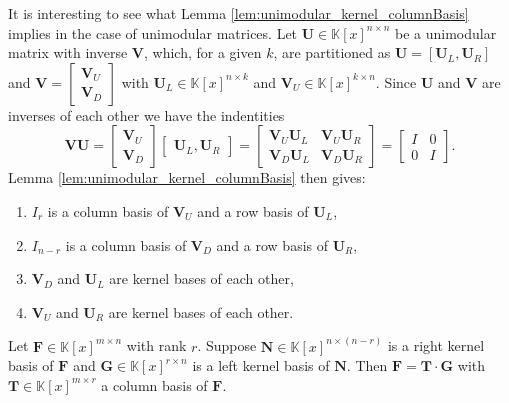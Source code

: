 \begin{rem}
\label{cor:unimodular_kernel_columnBasis2} It is interesting to see
what Lemma \ref{lem:unimodular_kernel_columnBasis} implies in the
case of unimodular matrices. Let $\mathbf{U}\in\mathbb{K}\left[x\right]^{n\times n}$
be a unimodular matrix with inverse $\mathbf{V}$, which, for a given
$k$, are partitioned as $\mathbf{U}=\left[\mathbf{U}_{L},\mathbf{U}_{R}\right]$
and $\mathbf{V}=\begin{bmatrix}\mathbf{V}_{U}\\
\mathbf{V}_{D}
\end{bmatrix}$ with $\mathbf{U}_{L}\in\mathbb{K}\left[x\right]^{n\times k}$ and
$\mathbf{V}_{U}\in\mathbb{K}\left[x\right]^{k\times n}$. Since $\mathbf{U}$
and $\mathbf{V}$ are inverses of each other we have the indentities
\begin{equation}
\mathbf{V}\mathbf{U}=\begin{bmatrix}\mathbf{V}_{U}\\
\mathbf{V}_{D}
\end{bmatrix}\begin{bmatrix}\mathbf{U}_{L},\mathbf{U}_{R}\end{bmatrix}=\begin{bmatrix}\mathbf{V}_{U}\mathbf{U}_{L} & \mathbf{V}_{U}\mathbf{U}_{R}\\
\mathbf{V}_{D}\mathbf{U}_{L} & \mathbf{V}_{D}\mathbf{U}_{R}
\end{bmatrix}=\begin{bmatrix}I & 0\\
0 & I
\end{bmatrix}.\label{inverse}
\end{equation}
Lemma \ref{lem:unimodular_kernel_columnBasis} then gives: 
\begin{enumerate}
\item $I_{r}$ is a column basis of $\mathbf{V}_{U}$ and a row basis of
$\mathbf{U}_{L}$, 
\item $I_{n-r}$ is a column basis of $\mathbf{V}_{D}$ and a row basis
of $\mathbf{U}_{R}$, 
\item $\mathbf{V}_{D}$ and $\mathbf{U}_{L}$ are kernel bases of each other, 
\item $\mathbf{V}_{U}$ and $\mathbf{U}_{R}$ are kernel bases of each other. 
\end{enumerate}
\end{rem}
\begin{lem}
\label{lem:matrixGCD} Let $\mathbf{F}\in\mathbb{K}\left[x\right]^{m\times n}$
with rank $r$. Suppose %
 $\mathbf{N}\in\mathbb{K}\left[x\right]^{n\times(n-r)}$ is a right
kernel basis of $\mathbf{F}$ and %
$\mathbf{G}\in\mathbb{K}\left[x\right]^{r\times n}$ is a left kernel
basis of $\mathbf{N}$. %
Then $\mathbf{F}=\mathbf{T}\cdot\mathbf{G}$ with $\mathbf{T}\in\mathbb{K}\left[x\right]^{m\times r}$
a column basis of $\mathbf{F}$. \end{lem}
